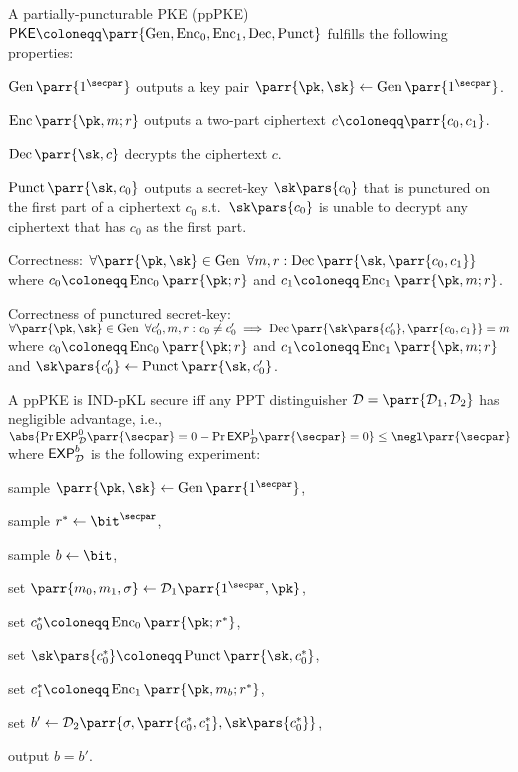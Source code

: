 \begin{definition}
    A partially-puncturable PKE (ppPKE) \(\PKE \coloneqq \parr{\Gen, \Enc_0, \Enc_1, \Dec, \Punct}\) fulfills the following properties:
    \begin{sitemize}
        \item \(\Gen\parr{1^\secpar}\) outputs a key pair \(\parr{\pk,\sk} \gets \Gen\parr{1^\secpar}\).
        \item \(\Enc\parr{\pk,m;r}\) outputs a two-part ciphertext \(c \coloneqq \parr{c_0,c_1}\).
        \item \(\Dec\parr{\sk,c}\) decrypts the ciphertext \(c\).
        \item \(\Punct\parr{\sk,c_0}\) outputs a secret-key \(\sk\pars{c_0}\) that is punctured on the first part of a ciphertext \(c_0\) s.t.\ \(\sk\pars{c_0}\) is unable to decrypt any ciphertext that has \(c_0\) as the first part.
        \item Correctness:
        \(\forall \parr{\pk,\sk} \in \Gen\ \forall m,r : \Dec\parr{\sk,\parr{c_0,c_1}}\) where \(c_0 \coloneqq \Enc_0\parr{\pk;r}\) and \(c_1 \coloneqq \Enc_1\parr{\pk,m;r}\).
        \item Correctness of punctured secret-key:
        \(\forall \parr{\pk,\sk} \in \Gen\ \forall c'_0,m,r : c_0 \neq c'_0 \implies \Dec\parr{\sk\pars{c'_0},\parr{c_0,c_1}} = m\) where \(c_0 \coloneqq \Enc_0\parr{\pk;r}\) and \(c_1 \coloneqq \Enc_1\parr{\pk,m;r}\) and \(\sk\pars{c'_0} \gets \Punct\parr{\sk,c'_0}\).
    \end{sitemize}
\end{definition}

\begin{definition}
    A ppPKE is IND-pKL secure iff any PPT distinguisher \(\D = \parr{\D_1,\D_2}\) has negligible advantage, i.e., \(\abs{\Pr{\mathsf{EXP}^0_\D\parr{\secpar} = 0} - \Pr{\mathsf{EXP}^1_\D\parr{\secpar} = 0}} \leq \negl\parr{\secpar}\) where \(\mathsf{EXP}^b_{\mathcal{D}}\) is the following experiment:
    \begin{sitemize}
        \item sample \(\parr{\pk,\sk} \gets \Gen\parr{1^\secpar}\),
        \item sample \(r^* \gets \bit^\secpar\),
        \item sample \(b \gets \bit\),
        \item set \(\parr{m_0,m_1,\sigma} \gets \D_1\parr{1^\secpar,\pk}\),
        \item set \(c_0^* \coloneqq \Enc_0\parr{\pk;r^*}\),
        \item set \(\sk\pars{c^*_0} \coloneqq \Punct\parr{\sk,c_0^*}\),
        \item set \(c_1^* \coloneqq \Enc_1\parr{\pk,m_b;r^*}\),
        \item set \(b' \gets \D_2\parr{\sigma,\parr{c^*_0,c^*_1},\sk\pars{c^*_0}}\),
        \item output \(b = b'\).
    \end{sitemize}
\end{definition}


